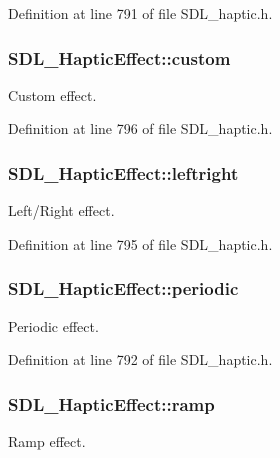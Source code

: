 Definition at line 791 of file S\+D\+L\+\_\+haptic.\+h.

\hypertarget{unionSDL__HapticEffect_a0b2d2af28c515cc39896b2b7c23019d2}{
\subsubsection[{custom}]{ S\+D\+L\+\_\+\+Haptic\+Effect\+::custom}}\label{unionSDL__HapticEffect_a0b2d2af28c515cc39896b2b7c23019d2}
Custom effect. 

Definition at line 796 of file S\+D\+L\+\_\+haptic.\+h.

\hypertarget{unionSDL__HapticEffect_a3c254b81c1ff41c7888eee0cd0076a12}{
\subsubsection[{leftright}]{ S\+D\+L\+\_\+\+Haptic\+Effect\+::leftright}}\label{unionSDL__HapticEffect_a3c254b81c1ff41c7888eee0cd0076a12}
Left/\+Right effect. 

Definition at line 795 of file S\+D\+L\+\_\+haptic.\+h.

\hypertarget{unionSDL__HapticEffect_a8320ec4db6ec1dc1d30feb62ee2a2f04}{
\subsubsection[{periodic}]{ S\+D\+L\+\_\+\+Haptic\+Effect\+::periodic}}\label{unionSDL__HapticEffect_a8320ec4db6ec1dc1d30feb62ee2a2f04}
Periodic effect. 

Definition at line 792 of file S\+D\+L\+\_\+haptic.\+h.

\hypertarget{unionSDL__HapticEffect_a1d32ef4c2d1cc89dc938b392f6ad81bd}{
\subsubsection[{ramp}]{ S\+D\+L\+\_\+\+Haptic\+Effect\+::ramp}}\label{unionSDL__HapticEffect_a1d32ef4c2d1cc89dc938b392f6ad81bd}
Ramp effect. 

